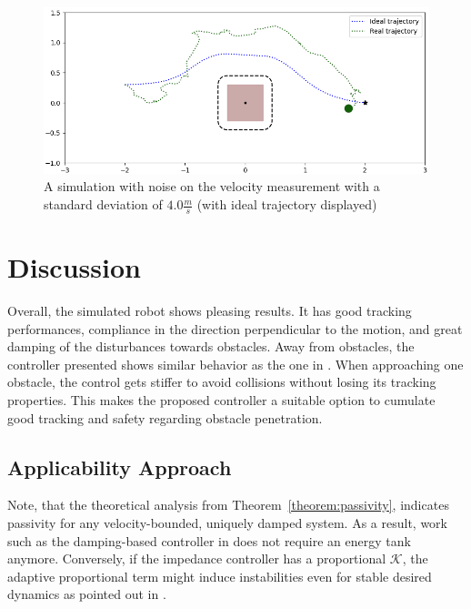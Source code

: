 \documentclass[conference]{IEEEtran}
\begin{document}
\begin{figure}
\centerline{\includegraphics[width=\columnwidth]{figures/vel_noise_4.0.png}}
\caption{A simulation with noise on the velocity measurement with a standard deviation of $4.0 \frac{m}{s}$  (with ideal trajectory displayed)}
\label{fig_2_vel_noise}
\end{figure}
 
\section{Discussion}
Overall, the simulated robot shows pleasing results. It has good tracking performances, compliance in the direction perpendicular to the motion, and great damping of the disturbances towards obstacles.
Away from obstacles, the controller presented shows similar behavior as the one in \cite{kronander2015passive}. When approaching one obstacle, the control gets stiffer to avoid collisions without losing its tracking properties. This makes the proposed controller a suitable option to cumulate good tracking and safety regarding obstacle penetration.

\subsection{Applicability Approach}
Note, that the theoretical analysis from Theorem~\ref{theorem:passivity}, indicates passivity for any velocity-bounded, uniquely damped system. As a result, work such as the damping-based controller in  \cite{kronander2015passive} does not require an energy tank anymore.
Conversely, if the impedance controller has a proportional $\mathcal{K}$, the adaptive proportional term might induce instabilities even for stable desired dynamics as pointed out in \cite{ferraguti2013tank, kronander2016stability}.


\renewcommand*{\bibfont}{\footnotesize}
\printbibliography
\end{document}
